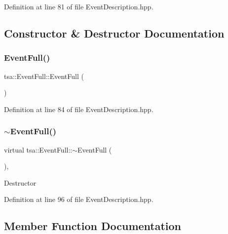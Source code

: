 Definition at line 81 of file Event\+Description.\+hpp.



\subsection{Constructor \& Destructor Documentation}
\mbox{\label{classtsa_1_1_event_full_a393a0a4f3d8645e428e1fa859ee6e27b}} 
\subsubsection{\texorpdfstring{Event\+Full()}{EventFull()}}
{\footnotesize\ttfamily tsa\+::\+Event\+Full\+::\+Event\+Full (\begin{DoxyParamCaption}{ }\end{DoxyParamCaption})\hspace{0.3cm}{\ttfamily [inline]}}



Definition at line 84 of file Event\+Description.\+hpp.

\mbox{\label{classtsa_1_1_event_full_a4f581518368d444de09bedaff348cf15}} 
\subsubsection{\texorpdfstring{$\sim$\+Event\+Full()}{~EventFull()}}
{\footnotesize\ttfamily virtual tsa\+::\+Event\+Full\+::$\sim$\+Event\+Full (\begin{DoxyParamCaption}{ }\end{DoxyParamCaption})\hspace{0.3cm}{\ttfamily [inline]}, {\ttfamily [virtual]}}

Destructor 

Definition at line 96 of file Event\+Description.\+hpp.



\subsection{Member Function Documentation}
\mbox{\label{classtsa_1_1_event_full_a94cac0a4cea4fc0650ee189717efaf62}} 
